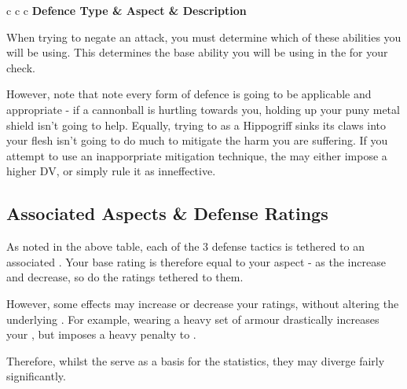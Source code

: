 \begin{center}
	\begin{rndtable}{c c c}
		\bf Defence Type	&	\bf Aspect	&	\bf Description 
		\\
	\end{rndtable}
\end{center}

When trying to negate an attack, you must determine which of these abilities you will be using. This determines the base ability you will be using in the  for your  check. 

However, note that note every form of defence is going to be applicable and appropriate - if a cannonball is hurtling towards you, holding up your puny metal shield isn't going to help. Equally, trying to  as a Hippogriff sinks its claws into your flesh isn't going to do much to mitigate the harm you are suffering. If you attempt to use an inapporpriate mitigation technique, the  may either impose a higher DV, or simply rule it as inneffective. 

\subsection{Associated Aspects \& Defense Ratings}

As noted in the above table, each of the 3 defense tactics is tethered to an associated . Your base  rating is therefore equal to your  aspect - as the  increase and decrease, so do the  ratings tethered to them. 

However, some effects may increase or decrease your  ratings, without altering the underlying . For example, wearing a heavy set of armour drastically increases your , but imposes a heavy penalty to . 

Therefore, whilst the  serve as a basis for the  statistics, they may diverge fairly significantly. 

